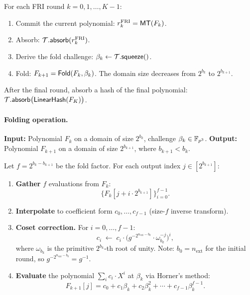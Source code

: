 For each FRI round $k = 0, 1, \ldots, K-1$:
\begin{enumerate}[label=(\roman*)]
  \item Commit the current polynomial:
        $r_k^{\mathrm{FRI}} = \textsf{MT}(F_k)$.
  \item Absorb: $\mathcal{T}.\textsf{absorb}(r_k^{\mathrm{FRI}})$.
  \item Derive the fold challenge: $\beta_k \leftarrow \mathcal{T}.\textsf{squeeze}()$.
  \item Fold: $F_{k+1} = \textsf{Fold}(F_k, \beta_k)$.
        The domain size decreases from $2^{b_k}$ to $2^{b_{k+1}}$.
\end{enumerate}

After the final round, absorb a hash of the final polynomial:
$\mathcal{T}.\textsf{absorb}\bigl(\textsf{LinearHash}(F_K)\bigr)$.

\paragraph{Folding operation.}
\textbf{Input:}
Polynomial $F_k$ on a domain of size $2^{b_k}$, challenge $\beta_k \in \mathbb{F}_{p^3}$.
\textbf{Output:}
Polynomial $F_{k+1}$ on a domain of size $2^{b_{k+1}}$, where $b_{k+1} < b_k$.

Let $f = 2^{b_k - b_{k+1}}$ be the fold factor.
For each output index $j \in [2^{b_{k+1}}]$:

\begin{enumerate}[label=(\roman*)]
  \item \textbf{Gather} $f$ evaluations from $F_k$:
        \[
          \bigl\{F_k[j + i \cdot 2^{b_{k+1}}]\bigr\}_{i=0}^{f-1}.
        \]

  \item \textbf{Interpolate} to coefficient form $c_0, \ldots, c_{f-1}$
        (size-$f$ inverse transform).

  \item \textbf{Coset correction.}
        For $i = 0, \ldots, f-1$:
        \begin{equation}
          \label{eq:coset-correction}
          c_i \;\leftarrow\; c_i \cdot
            \bigl(g^{-2^{n_{\mathrm{ext}} - b_k}}
                  \cdot \omega_{b_k}^{-j}\bigr)^i,
        \end{equation}
        where $\omega_{b_k}$ is the primitive $2^{b_k}$-th root of unity.
        Note: $b_0 = n_{\mathrm{ext}}$ for the initial round, so
        $g^{-2^{n_{\mathrm{ext}} - b_0}} = g^{-1}$.

  \item \textbf{Evaluate} the polynomial $\sum_{i} c_i \cdot X^i$ at $\beta_k$
        via Horner's method:
        \[
          F_{k+1}[j] = c_0 + c_1 \beta_k + c_2 \beta_k^2 + \cdots + c_{f-1}\beta_k^{f-1}.
        \]
\end{enumerate}

